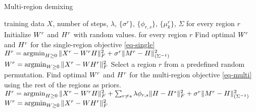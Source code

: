 \begin{algorithm}[tbh]
   \caption{Multi-region demixing}
   \label{alg:multimix}
   \begin{algorithmic}[1]
    training data $X$, number of steps, $\lambda$, $\{\sigma^r\}$, $\{\phi_{r,s}\}$, $\{\mu^r_k\}$, $\Sigma$
    for every region $r$
   \STATE \quad Initialize $W^r$ and ${H}^r$ with random values.
    for every region $r$ 
   \STATE \quad Find optimal $W^r$ and ${H}^r$ for the single-region objective \eqref{eq-single}
   \STATE \quad $H^r = \argmin_{H \geq 0 } \| X^r - W^rH\|^2_F +  \sigma^r \| M^r - \H \|^2_{(\Sigma^{-1})} $
   \STATE \quad $ W^r = \argmin_{W \geq 0} \| X^r - WH^r\|^2_F $
   \REPEAT
   \STATE Select a region $r$ from a predefined random permutation.
   \STATE Find optimal $W^r$ and ${H}^r$ for the multi-region objective \eqref{eq-multi} using the rest of the regions as priors.
   \STATE  $H^r = \argmin_{H \geq 0 } \| X^r - W^rH\|^2_F + \sum_{r \neq s} \lambda \phi_{r , s} \| \H - \H^s \|_F^2  + \sigma^r \| M^r - \H \|^2_{(\Sigma^{-1})} $
   \STATE  $ W^r = \argmin_{W \geq 0} \| X^r - WH^r\|^2_F $
\end{algorithmic}
\end{algorithm}


